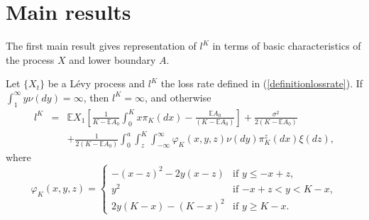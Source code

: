 \documentclass{aptpub}
\begin{document}
\section{Main results}\label{sec:main}
The first main result gives representation of $l^K$ in terms of basic characteristics of the process $X$ and lower boundary $A$.
\begin{thm}
Let $\{X_t\}$ be a L\'{e}vy process and $l^K$ the loss rate defined in (\ref{definitionlossrate}). If $\int_1^{\infty}y\nu(dy)=\infty$, then $l^K=\infty$, and otherwise
\begin{eqnarray}
l^K&=&\mathbb{E}X_1\left[\frac{1}{K-\mathbb{E}A_0}\int_0^Kx\pi_K(dx)-\frac{\mathbb{E}A_0}{(K-\mathbb{E}A_0)}\right]+\frac{\sigma^2}{2(K-\mathbb{E}A_0)} \\ \nonumber &&+\frac{1}{2(K-\mathbb{E}A_0)}\int_0^a\int_z^K\int_{-\infty}^{\infty}\varphi_K(x,y,z)\nu(dy)\pi_K^z(dx)\xi(dz),
\end{eqnarray}
where
$$\varphi_K(x,y,z)=\left\{ \begin{array}{ll}
-(x-z)^2-2y(x-z)&\mbox{if $y\leq -x+z$},\\
y^2&\mbox{if $-x+z<y<K-x$},\\
2y(K-x)-(K-x)^2&\mbox{if $y\geq K-x$.}
\end{array} \right.$$
\end{thm}
\end{document}
